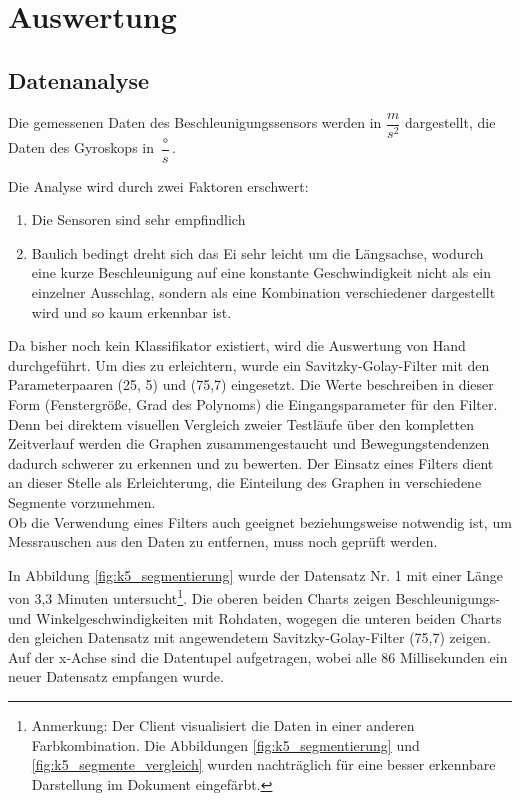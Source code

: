 \section{Auswertung}
\subsection{Datenanalyse}
Die gemessenen Daten des Beschleunigungssensors werden in $\dfrac{m}{s^{2}}$ 
dargestellt, die Daten des Gyroskops in $\dfrac{\circ}{s}$.

Die Analyse wird durch zwei Faktoren erschwert:
\begin{enumerate}
	\item Die Sensoren sind sehr empfindlich
	\item Baulich bedingt dreht sich das Ei sehr leicht um die Längsachse, wodurch eine kurze Beschleunigung auf eine konstante Geschwindigkeit nicht als ein einzelner Ausschlag, sondern als eine Kombination verschiedener dargestellt wird und so kaum erkennbar ist.
\end{enumerate}

Da bisher noch kein Klassifikator existiert, wird die Auswertung von Hand durchgeführt. Um dies zu erleichtern, wurde ein Savitzky-Golay-Filter mit den Parameterpaaren (25, 5) und (75,7) eingesetzt. Die Werte beschreiben in dieser Form (Fenstergröße, Grad des Polynoms) die Eingangsparameter für den Filter. Denn bei direktem visuellen Vergleich zweier Testläufe über den kompletten Zeitverlauf werden die Graphen zusammengestaucht und Bewegungstendenzen dadurch schwerer zu erkennen und zu bewerten. Der Einsatz eines Filters dient an dieser Stelle als Erleichterung, die Einteilung des Graphen in verschiedene Segmente vorzunehmen. \\
Ob die Verwendung eines Filters auch geeignet beziehungsweise notwendig ist, um Messrauschen aus den Daten zu entfernen, muss noch geprüft werden.

In Abbildung \ref{fig:k5_segmentierung} wurde der Datensatz Nr. 1 mit einer Länge von 3,3 Minuten untersucht\footnote{Anmerkung: Der Client visualisiert die Daten in einer anderen Farbkombination. Die Abbildungen \ref{fig:k5_segmentierung} und \ref{fig:k5_segmente_vergleich} wurden nachträglich für eine besser erkennbare Darstellung im Dokument eingefärbt.}. Die oberen beiden Charts zeigen Beschleunigungs- und Winkelgeschwindigkeiten mit Rohdaten, wogegen die unteren beiden Charts den gleichen Datensatz mit angewendetem Savitzky-Golay-Filter (75,7) zeigen. Auf der x-Achse sind die Datentupel aufgetragen, wobei alle 86 Millisekunden ein neuer Datensatz empfangen wurde.


